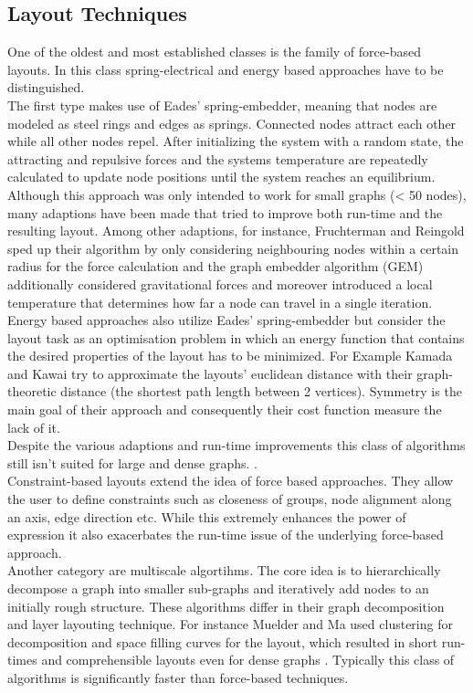 \subsection{Layout Techniques}
One of the oldest and most established classes is the family of force-based layouts. In this class spring-electrical and energy based approaches have to be distinguished.\\ 
The first type makes use of Eades' spring-embedder, meaning that nodes are modeled as steel rings and edges as springs. Connected nodes attract each other while all other nodes repel. After initializing the system with a random state, the attracting and repulsive forces and the systems temperature are repeatedly calculated to update node positions until the system reaches an equilibrium. Although this approach was only intended to work for small graphs (< 50 nodes), many adaptions have been made that tried to improve both run-time and the resulting layout. Among other adaptions, for instance, Fruchterman and Reingold sped up their algorithm by only considering neighbouring nodes within a certain radius for the force calculation and the graph embedder algorithm (GEM) additionally considered gravitational forces and moreover introduced a local temperature that determines how far a node can travel in a single iteration. \\
Energy based approaches also utilize Eades' spring-embedder but consider the layout task as an optimisation problem in which an energy function that contains the desired properties of the layout has to be minimized. For Example Kamada and Kawai try to approximate the layouts' euclidean distance with their graph-theoretic distance (the shortest path length between 2 vertices). Symmetry is the main goal of their approach and consequently their cost function measure the lack of it. \\
Despite the various adaptions and run-time improvements this class of algorithms still isn't suited for large and dense graphs.\cite{Gibson2013} \cite{VonLandesberger2011}.
\\
Constraint-based layouts extend the idea of force based approaches. They allow the user to define constraints such as closeness of groups, node alignment along an axis, edge direction etc. While this extremely enhances the power of expression it also exacerbates the run-time issue of the underlying force-based approach\cite{VonLandesberger2011}.\\
Another category are multiscale algortihms. The core idea is to hierarchically decompose a graph into smaller sub-graphs and iteratively add nodes to an initially rough structure. These algorithms differ in their graph decomposition and layer layouting technique. For instance Muelder and Ma used clustering for decomposition and space filling curves for the layout, which resulted in short run-times and comprehensible layouts even for dense graphs  \cite{Muelder2008}. Typically this class of algorithms is significantly faster than force-based techniques\cite{VonLandesberger2011}. \\
